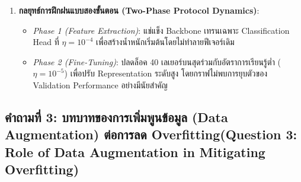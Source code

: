 \documentclass[12pt,a4paper]{article}
\begin{document}
\begin{ansbox}[fontupper=\small, left=6pt, right=6pt, top=3pt, bottom=3pt]
\begin{enumerate}[leftmargin=14pt, itemsep=1.5pt, topsep=1pt, parsep=0pt]
    การฝึกฝนจากศูนย์บนภาพฝึก 18,000 ภาพต้องเรียนรู้ตัวกรองทุกระดับใหม่ทั้งหมด ขณะที่ MobileNetV2 มี Visual Priors จาก ImageNet จึงเริ่มต้นจากตัวกรองขอบและ Texture ที่ถ่ายโอนได้ แล้วปรับเฉพาะ Representation ระดับสูงให้เข้ากับ Dogs vs. Cats
    \item \textbf{กลยุทธ์การฝึกฝนแบบสองขั้นตอน (Two-Phase Protocol Dynamics)}:
    \begin{itemize}[leftmargin=10pt, itemsep=0.5pt, topsep=0.5pt, parsep=0pt]
        \item \textit{Phase 1 (Feature Extraction)}: แช่แข็ง Backbone เทรนเฉพาะ Classification Head ที่ $\eta = 10^{-4}$ เพื่อสร้างน้ำหนักเริ่มต้นโดยไม่ทำลายฟีเจอร์เดิม
        \item \textit{Phase 2 (Fine-Tuning)}: ปลดล็อค 40 เลเยอร์บนสุดร่วมกับอัตราการเรียนรู้ต่ำ ($\eta = 10^{-5}$) เพื่อปรับ Representation ระดับสูง โดยกราฟไม่พบการยุบตัวของ Validation Performance อย่างมีนัยสำคัญ
    \end{itemize}
\end{enumerate}
\end{ansbox}

\clearpage
\subsection*{คำถามที่ 3: บทบาทของการเพิ่มพูนข้อมูล (Data Augmentation) ต่อการลด Overfitting\newline \normalsize(Question 3: Role of Data Augmentation in Mitigating Overfitting)}
\end{document}

